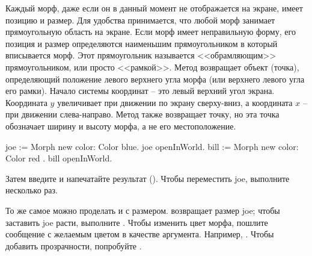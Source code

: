 \documentclass[a4paper,10pt,twoside]{book}
\begin{document}
Каждый морф, даже если он в данный момент не отображается на экране, имеет позицию и размер.
Для удобства принимается, что любой морф занимает прямоугольную область на экране. Если морф имеет неправильную форму, его позиция и размер определяются наименьшим прямоугольником в который вписывается морф. Этот прямоугольник называется <<обрамляющим>> прямоугольником, или просто <<рамкой>>.
Метод  возвращает объект  (точка), определяющий положение левого верхнего угла морфа (или верхнего левого угла его рамки).
Начало системы координат -- это левый верхний угол экрана. Координата $y$ увеличивает при движении по экрану сверху-вниз, а координата $x$ -- при движении слева-направо.
Метод  также возвращает точку, но эта точка обозначает ширину и высоту морфа, а не его местоположение.

\begin{code}{}
joe := Morph new color: Color blue.
joe openInWorld.
bill := Morph new color: Color red .
bill openInWorld.
\end{code}
\noindent
Затем введите  и напечатайте результат ().
Чтобы переместить joe, выполните  несколько раз.

То же самое можно проделать и с размером.
  возвращает размер joe; чтобы заставить joe расти, выполните .
Чтобы изменить цвет морфа, пошлите сообщение  с желаемым цветом в качестве аргумента. Например, .
Чтобы добавить прозрачности, попробуйте .
\end{document}
